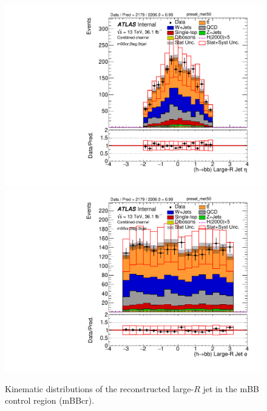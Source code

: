 \begin{figure}[!h]
\begin{center}
\includegraphics[scale=0.33]{./figures/boosted/PlotsInMbbCR/DataMC_2tag_0bjet_mbbcr_lepton_presel_met50_HbbEta} 
\includegraphics[scale=0.33]{./figures/boosted/PlotsInMbbCR/DataMC_2tag_0bjet_mbbcr_lepton_presel_met50_HbbPhi} 
\caption{Kinematic distributions of the reconstructed large-$R$ jet in the mBB control region (mBBcr).}
\label{fig:boosted_mbbcr_largerjet}
\end{center}
\end{figure}
\newpage
